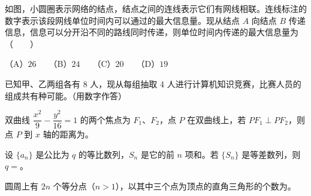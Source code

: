\begin{question}
如图，小圆圈表示网络的结点，结点之间的连线表示它们有网线相联。连线标注的数字表示该段网线单位时间内可以通过的最大信息量。现从结点 $A$ 向结点 $B$ 传递信息，信息可以分开沿不同的路线同时传递，则单位时间内传递的最大信息量为\mbox{（　　）}
\nopagebreak[4]
\begin{center}\end{center}
\nopagebreak[4]
（A）$26$　　（B）$24$　　（C）$20$　　（D）$19$

\end{question}

\begin{question}
已知甲、乙两组各有 8 人，现从每组抽取 4 人进行计算机知识竞赛，比赛人员的组成共有\gkblank{}种可能。（用数字作答）

\end{question}
\begin{question}
双曲线 $\dfrac{x^2}{9}-\dfrac{y^2}{16}=1$ 的两个焦点为 $F_1\text{、}F_2$，点 $P$ 在双曲线上，若 $PF_1\perp PF_2$，则点 $P$ 到 $x$ 轴的距离为\gkblank{}。

\end{question}
\begin{question}
设 $\{a_n\}$ 是公比为 $q$ 的等比数列，$S_n$ 是它的前 $n$ 项和。若 $\{S_n\}$ 是等差数列，则 $q=$\gkblank{}。

\end{question}
\begin{question}
圆周上有 $2n$ 个等分点（$n>1$），以其中三个点为顶点的直角三角形的个数为\gkblank{}。

\end{question}

